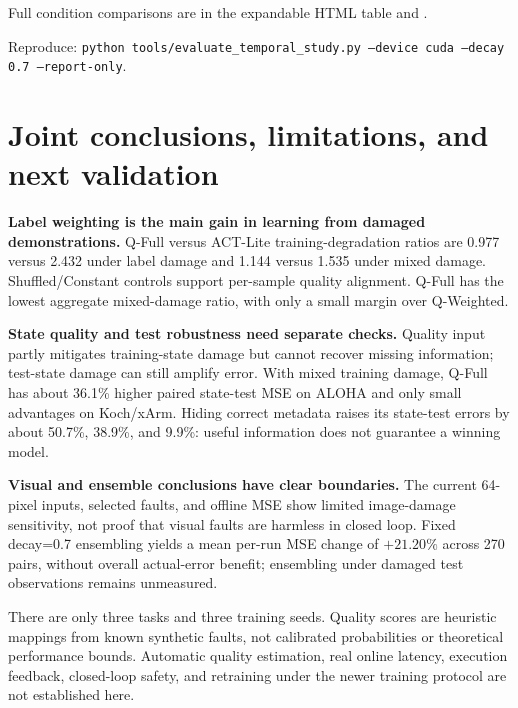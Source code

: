 \documentclass[11pt,a4paper]{article}
\newcommand{\code}[1]{\texttt{\small #1}}
\begin{document}
\noindent Full condition comparisons are in the expandable HTML table and .
\par\noindent Reproduce: \code{python tools/evaluate\_temporal\_study.py --device cuda --decay 0.7 --report-only}.
\par\endgroup
\clearpage\section{Joint conclusions, limitations, and next validation}
\textbf{Label weighting is the main gain in learning from damaged demonstrations.} Q-Full versus ACT-Lite training-degradation ratios are 0.977 versus 2.432 under label damage and 1.144 versus 1.535 under mixed damage. Shuffled/Constant controls support per-sample quality alignment. Q-Full has the lowest aggregate mixed-damage ratio, with only a small margin over Q-Weighted.

\textbf{State quality and test robustness need separate checks.} Quality input partly mitigates training-state damage but cannot recover missing information; test-state damage can still amplify error. With mixed training damage, Q-Full has about 36.1\% higher paired state-test MSE on ALOHA and only small advantages on Koch/xArm. Hiding correct metadata raises its state-test errors by about 50.7\%, 38.9\%, and 9.9\%: useful information does not guarantee a winning model.

\textbf{Visual and ensemble conclusions have clear boundaries.} The current 64-pixel inputs, selected faults, and offline MSE show limited image-damage sensitivity, not proof that visual faults are harmless in closed loop. Fixed decay=0.7 ensembling yields a mean per-run MSE change of $+21.20\%$ across 270 pairs, without overall actual-error benefit; ensembling under damaged test observations remains unmeasured.

There are only three tasks and three training seeds. Quality scores are heuristic mappings from known synthetic faults, not calibrated probabilities or theoretical performance bounds. Automatic quality estimation, real online latency, execution feedback, closed-loop safety, and retraining under the newer training protocol are not established here.
\end{document}
